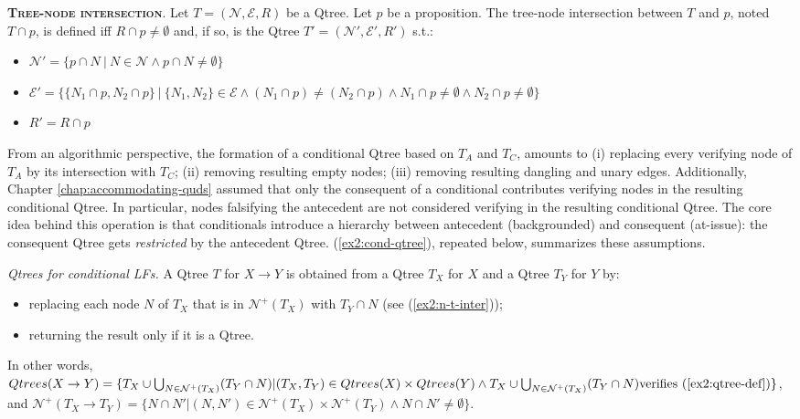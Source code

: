 \begin{exe}
	 {\textsc{\textbf{Tree-node intersection}}. Let $T=(\mathcal{N}, \mathcal{E}, R)$ be a Qtree. Let $p$ be a proposition. The tree-node intersection between $T$ and $p$, noted $T \cap p$, is defined iff $R \cap p \neq \emptyset$ and, if so, is the Qtree $T'=(\mathcal{N}', \mathcal{E}', R')$ s.t.:
		\begin{itemize}
			\item $\mathcal{N}' = \lbrace p \cap N \ | \ N \in \mathcal{N} \wedge p \cap N \neq \emptyset\rbrace$
			\item $\mathcal{E}' = \lbrace \lbrace N_1\cap p, N_2\cap p\rbrace \ | \ \lbrace N_1, N_2\rbrace \in \mathcal{E} \wedge (N_1\cap p) \neq (N_2\cap p) \wedge N_1\cap p \neq \emptyset \wedge N_2\cap p \neq \emptyset \rbrace$
			\item $R' = R\cap p$
	\end{itemize}}
\end{exe} 

From an algorithmic perspective, the formation of a conditional Qtree based on $T_A$ and $T_C$, amounts to (i) replacing every verifying node of $T_A$ by its intersection with $T_C$; (ii) removing resulting empty nodes; (iii) removing resulting dangling and unary edges. Additionally, Chapter \ref{chap:accommodating-quds} assumed that only the consequent of a conditional contributes verifying nodes in the resulting conditional Qtree. In particular, nodes falsifying the antecedent are not considered verifying in the resulting conditional Qtree. The core idea behind this operation is that conditionals introduce a hierarchy between antecedent (backgrounded) and consequent (at-issue): the consequent Qtree gets \textit{restricted} by the antecedent Qtree. (\ref{ex2:cond-qtree}), repeated below, summarizes these assumptions.

\begin{exe}
	 {\textit{Qtrees for conditional LFs.} A Qtree $T$ for $X \rightarrow Y$ is obtained from a Qtree $T_X$ for $X$ and a Qtree $T_Y$ for $Y$ by:
		\begin{itemize}
			\item replacing each node $N$ of $T_X$ that is in $\mathcal{N}^+(T_X)$ with $T_Y \cap N$ (see (\ref{ex2:n-t-inter}));
			\item returning the result only if it is a Qtree.
		\end{itemize}
		In other words, $Qtrees(X \rightarrow Y) = \lbrace T_X \cup \bigcup_{N\in \mathcal{N}^+(T_X)}(T_Y \cap N) | (T_X, T_Y) \in Qtrees(X) \times Qtrees(Y) \wedge T_X \cup \bigcup_{N\in \mathcal{N}^+(T_X)}(T_Y \cap N) \text{verifies (\ref{ex2:qtree-def})}  \rbrace$, and $\mathcal{N}^+(T_X \rightarrow T_Y) = \lbrace N \cap N' | (N, N') \in \mathcal{N}^+(T_X) \times \mathcal{N}^+(T_Y) \wedge N \cap N' \neq \emptyset \rbrace$.}
\end{exe}

